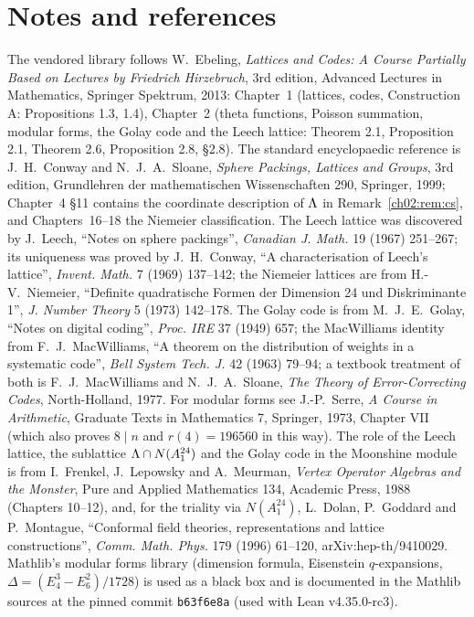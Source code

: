 \section{Notes and references}\label{ch02:sec:notes}

The vendored library follows W.~Ebeling, \emph{Lattices and Codes: A Course Partially Based on
Lectures by Friedrich Hirzebruch}, 3rd edition, Advanced Lectures in Mathematics, Springer
Spektrum, 2013: Chapter~1 (lattices, codes, Construction A: Propositions 1.3, 1.4), Chapter~2
(theta functions, Poisson summation, modular forms, the Golay code and the Leech lattice:
Theorem 2.1, Proposition 2.1, Theorem 2.6, Proposition 2.8, \S2.8).  The standard encyclopaedic
reference is J.~H.~Conway and N.~J.~A.~Sloane, \emph{Sphere Packings, Lattices and Groups}, 3rd
edition, Grundlehren der mathematischen Wissenschaften 290, Springer, 1999; Chapter~4 \S11 contains
the coordinate description of ${\Lambda}$ in Remark~\ref{ch02:rem:cs}, and Chapters~16--18 the
Niemeier classification.  The Leech lattice was discovered by J.~Leech, ``Notes on sphere
packings'', \emph{Canadian J. Math.} 19 (1967) 251--267; its uniqueness was proved by J.~H.~Conway,
``A characterisation of Leech's lattice'', \emph{Invent. Math.} 7 (1969) 137--142; the Niemeier
lattices are from H.-V.~Niemeier, ``Definite quadratische Formen der Dimension 24 und
Diskriminante 1'', \emph{J. Number Theory} 5 (1973) 142--178.  The Golay code is from M.~J.~E.~Golay,
``Notes on digital coding'', \emph{Proc. IRE} 37 (1949) 657; the MacWilliams identity from
F.~J.~MacWilliams, ``A theorem on the distribution of weights in a systematic code'', \emph{Bell
System Tech. J.} 42 (1963) 79--94; a textbook treatment of both is F.~J.~MacWilliams and
N.~J.~A.~Sloane, \emph{The Theory of Error-Correcting Codes}, North-Holland, 1977.  For modular
forms see J.-P.~Serre, \emph{A Course in Arithmetic}, Graduate Texts in Mathematics 7, Springer,
1973, Chapter VII (which also proves $8\mid n$ and $r(4)=196560$ in this way).  The role of the
Leech lattice, the sublattice ${\Lambda}\cap N(A_1^{24})$ and the Golay code in the Moonshine module
is from I.~Frenkel, J.~Lepowsky and A.~Meurman, \emph{Vertex Operator Algebras and the Monster},
Pure and Applied Mathematics 134, Academic Press, 1988 (Chapters 10--12), and, for the triality
via $N(A_1^{24})$, L.~Dolan, P.~Goddard and P.~Montague, ``Conformal field theories, representations and
lattice constructions'', \emph{Comm. Math. Phys.} 179 (1996) 61--120, arXiv:hep-th/9410029.  Mathlib's
modular forms library (dimension formula, Eisenstein $q$-expansions, $\Delta=(E_4^3-E_6^2)/1728$)
is used as a black box and is documented in the Mathlib sources at the pinned commit \texttt{b63f6e8a} (used with
Lean v4.35.0-rc3).

